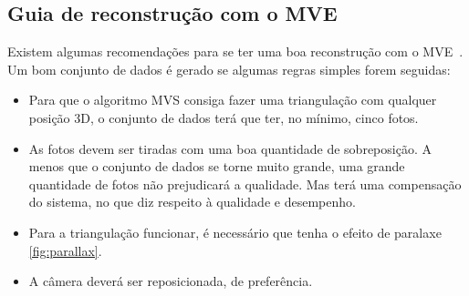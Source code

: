 \subsection*{Guia de reconstrução com o MVE}
Existem algumas recomendações para se ter uma boa reconstrução com o MVE~\cite{pipelinemve,mve}.
Um bom conjunto de dados é gerado se algumas regras simples forem seguidas:

\begin{itemize}

\item{Para que o algoritmo MVS consiga fazer uma triangulação com qualquer
  posição 3D, o conjunto de dados terá que ter, no mínimo, cinco fotos.}

\item{As fotos devem ser tiradas com uma boa quantidade de sobreposição. A menos que o conjunto de dados se torne muito grande, uma grande quantidade de fotos não prejudicará a qualidade. 
Mas terá uma compensação do sistema, no que diz respeito à qualidade e desempenho.}

\item{Para a triangulação funcionar, é necessário que tenha o efeito de paralaxe
    \ref{fig:parallax}.}

\item{A câmera deverá ser reposicionada, de preferência.}

\end{itemize}


